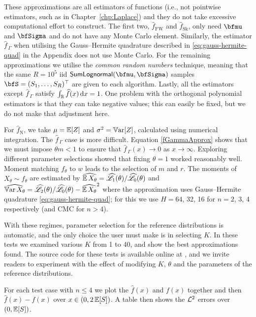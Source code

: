 These approximations are all estimators of functions (i.e., not pointwise estimators, such as in Chapter~\ref{chp:Laplace}) and they do not take excessive computational effort to construct. The first two, $\widehat{f}_{\mathrm{FW}}$ and $\widehat{f}_{\mathrm{Sk}}$, only need $\bfmu$ and $\bfSigma$ and do not have any Monte Carlo element. Similarly, the estimator $\widehat{f}_{\,\Gamma}$ when utilising the Gauss--Hermite quadrature described in \eqref{eq:gauss-hermite-quad}
in the Appendix does not use Monte Carlo. For the remaining approximations we utilise the \emph{common random numbers} technique, meaning that the same $R=10^5$ iid $\SLNDist(\bfmu, \bfSigma)$ samples $\bfS = (S_1, \dots, S_R)^\tr$ are given to each algorithm. Lastly, all the estimators except $\widehat{f}_{\,\Gamma}$ satisfy $\int_{\mathbb{R}} \widehat{f}(x) \mathop{}\!\mathrm{d} x = 1$. One problem with the orthogonal polynomial estimators is that they can take negative values; this can easily be fixed, but we do not make that adjustment here.

For $\widehat{f}_{\mathrm{N}}$, we take $\mu = \operatorname{{\mathbb E}}[Z]$ and $\sigma^2 = \operatorname{\mathbb{V}\mathrm{ar}}[Z]$, calculated using numerical integration.
The $\widehat{f}_{\,\Gamma}$ case is more difficult. Equation \eqref{fGammaApprox} shows that we must impose $\theta m < 1$ to ensure that $\widehat{f}_{\,\Gamma}(x)\to 0$ as $x\to \infty$.
Exploring different parameter selections showed that fixing $\theta = 1$ worked reasonably well. Moment matching $f_\theta$ to $w$ leads to the selection of $m$ and $r$. The moments of $X_\theta \sim f_\theta$ are estimated by
$ \widehat{\operatorname{{\mathbb E}} X_\theta} = \widehat{\mathscr{L}}_1(\theta) / \widehat{\mathscr{L}}_0(\theta)$  and
 $\widehat{\operatorname{\mathbb{V}\mathrm{ar}} X_\theta} = \widehat{\mathscr{L}}_2(\theta) / \widehat{\mathscr{L}}_0(\theta) - \widehat{\operatorname{{\mathbb E}} X_\theta}^2  $ where the approximation uses Gauss--Hermite quadrature \eqref{eq:gauss-hermite-quad}; for this we use $H = 64$, 32, 16 for $n=2$, 3, 4 respectively (and CMC for $n > 4$).

With these regimes, parameter selection for the reference distributions is automatic, and the only choice the user must make is in selecting $K$. In these tests we examined various $K$ from 1 to 40, and show the best approximations found.
The source code for these tests is available online at \cite{OrthogoCode}, and we invite readers to experiment with the effect of modifying $K$, $\theta$ and the parameters of the reference distributions.

For each test case with $n \le 4$ we plot the $\widehat{f}(x)$ and $f(x)$ together and then $\widehat{f}(x)-f(x)$ over $x \in (0, 2\operatorname{{\mathbb E}}[S])$. A table then shows the $\mathcal{L}^2$ errors over $(0, \operatorname{{\mathbb E}}[S])$.

